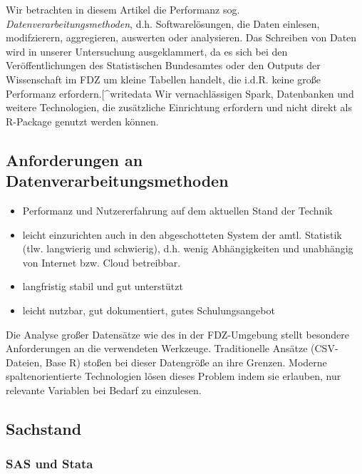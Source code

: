 \documentclass[
  german,
  10pt,
  twoside]{article}
\providecommand{\tightlist}{%
  \setlength{\itemsep}{0pt}\setlength{\parskip}{0pt}}
\begin{document}
Wir betrachten in diesem Artikel die Performanz sog.
\emph{Datenverarbeitungsmethoden}, d.h. Softwarelösungen, die Daten
einlesen, modifzierern, aggregieren, auswerten oder analysieren. Das
Schreiben von Daten wird in unserer Untersuchung ausgeklammert, da es
sich bei den Veröffentlichungen des Statistischen Bundesamtes oder den
Outputs der Wissenschaft im FDZ um kleine Tabellen handelt, die i.d.R.
keine große Performanz erfordern.{[}\^{}writedata Wir vernachlässigen
Spark, Datenbanken und weitere Technologien, die zusätzliche Einrichtung
erfordern und nicht direkt als R-Package genutzt werden können.

\subsection{Anforderungen an
Datenverarbeitungsmethoden}\label{anforderungen-an-datenverarbeitungsmethoden}

\begin{itemize}
\tightlist
\item
  Performanz und Nutzererfahrung auf dem aktuellen Stand der Technik
\item
  leicht einzurichten auch in den abgeschotteten System der amtl.
  Statistik (tlw. langwierig und schwierig), d.h. wenig Abhängigkeiten
  und unabhängig von Internet bzw. Cloud betreibbar.
\item
  langfristig stabil und gut unterstützt
\item
  leicht nutzbar, gut dokumentiert, gutes Schulungsangebot
\end{itemize}

Die Analyse großer Datensätze wie des in der FDZ-Umgebung stellt
besondere Anforderungen an die verwendeten Werkzeuge. Traditionelle
Ansätze (CSV-Dateien, Base R) stoßen bei dieser Datengröße an ihre
Grenzen. Moderne spaltenorientierte Technologien lösen dieses Problem
indem sie erlauben, nur relevante Variablen bei Bedarf zu einzulesen.

\subsection{Sachstand}\label{sachstand}

\subsubsection{SAS und Stata}\label{sas-und-stata}
\end{document}
